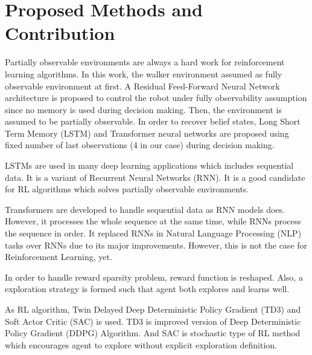 \section{Proposed Methods and Contribution}
\label{sec:proposed_methods}

Partially observable environments are always a hard work for reinforcement learning algorithms. 
In this work, the walker environment assumed as fully observable environment at first. 
A Residual Feed-Forward Neural Network architecture is proposed to control 
the robot under fully observability assumption since no memory is used during decision making. 
Then, the environment is assumed to be partially observable. 
In order to recover belief states, Long Short Term Memory (LSTM) and 
Transformer neural networks are proposed using fixed number of 
last observations (4 in our case) during decision making. 

LSTMs are used in many deep learning applications which includes sequential data. 
It is a variant of Recurrent Neural Networks (RNN). 
It is a good candidate for RL algorithms which solves partially observable environments. 

Transformers are developed to handle sequential data as RNN models does. 
However, it processes the whole sequence at the same time, while RNNs process the sequence in order. 
It replaced RNNs in Natural Language Processing (NLP) tasks over RNNs due to its major improvements. 
However, this is not the case for Reinforcement Learning, yet.

In order to handle reward sparsity problem, reward function is reshaped. Also, a exploration strategy is formed such that agent both explores and learns well. 

As RL algorithm, Twin Delayed Deep Deterministic Policy Gradient (TD3) and Soft Actor Critic (SAC) is used. TD3 is improved version of Deep Deterministic Policy Gradient (DDPG) Algorithm. And SAC is stochastic type of RL method which encourages agent to explore without explicit exploration definition.
